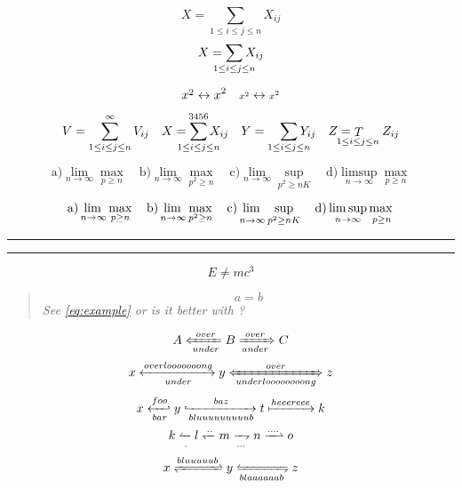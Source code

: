 \documentclass{article}
\newcommand{\horz}{\noindent\makebox[\linewidth]{\rule{\paperwidth}{0.4pt}}}
\begin{document}
\[
X = \sum_{1\le i\le j\le n} X_{ij}
\]
\[
X = \sum_{\mathclap{1\le i\le j\le n}} X_{ij}
\]

\horz

\[
\cramped{x^2} \leftrightarrow x^2 \quad
\cramped[\scriptstyle]{x^2} \leftrightarrow {\scriptstyle x^2}
\]

\horz

\[
V = \sum_{1\le i\le j\le n}^{\infty} V_{ij} \quad
X = \smashoperator{\sum_{1\le i\le j\le n}^{3456}} X_{ij} \quad
Y = \smashoperator[r]{\sum\limits_{1\le i\le j\le n}} Y_{ij} \quad
Z = \smashoperator[l]{\mathop{T}_{1\le i\le j\le n}} Z_{ij}
\]

\horz

\[
\text{a)} \lim_{n\to\infty} \max_{p\ge n} \quad
\text{b)} \lim_{n\to\infty} \max_{p^2\ge n} \quad
\text{c)} \lim_{n\to\infty} \sup_{p^2\ge nK} \quad
\text{d)} \limsup_{n\to\infty} \max_{p\ge n}
\]

\[
\text{a)} \adjustlimits\lim_{n\to\infty} \max_{p\ge n} \quad
\text{b)} \adjustlimits\lim_{n\to\infty} \max_{p^2\ge n} \quad
\text{c)} \adjustlimits\lim_{n\to\infty} \sup_{p^2\ge nK} \quad
\text{d)} \adjustlimits\limsup_{n\to\infty} \max_{p\ge n}
\]

\horz

\noindent\rule\textwidth{1pt}
\begin{align*} A &= B \end{align*}
\noindent\rule\textwidth{1pt}
\begin{align*}
\SwapAboveDisplaySkip
A &= B
\end{align*}

\horz

\begin{equation}
E \neq m c^3
\end{equation}

\horz

\begin{quote}\renewcommand*\rmdefault{ppl}\normalfont\itshape
\begin{equation*}
a=b \label{eq:example}\tag*{Q\&A}
\end{equation*}
See \ref{eq:example} or is it better with ?
\end{quote}

\horz

\[
A \xLeftarrow[under]{over} B \xRightarrow[under]{over} C
\]
\[
x \xleftrightarrow[under]{overlooooooong} y \xLeftrightarrow[underloooooooong]{over} z
\]
\[
x \xhookleftarrow[bar]{foo} y \xhookrightarrow[bluuuuuuuuub]{baz} t \xmapsto{heeereee} k
\]
\[
k \xleftharpoonup[.]{} l \xleftharpoondown{..} m \xrightharpoondown[...]{} n \xrightharpoonup{....} o
\]
\[
x \xrightleftharpoons{bluuuuub} y \xleftrightharpoons[blaaaaaab]{} z
\]
\end{document}
